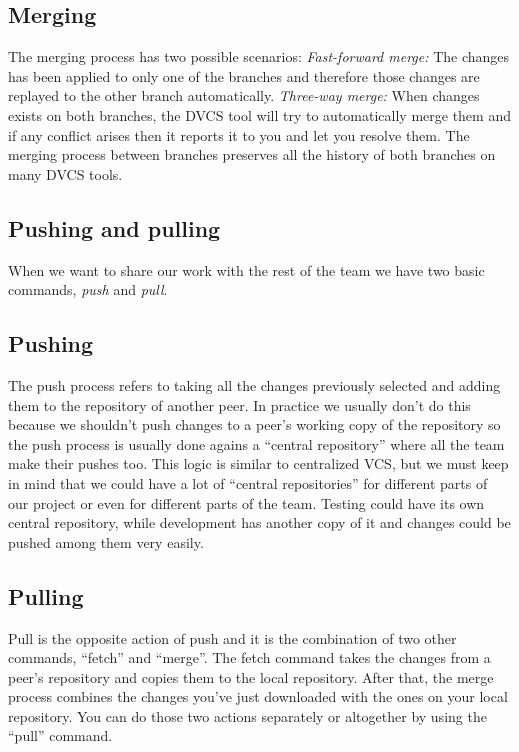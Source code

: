 \subsection{Merging}
The merging process has two possible scenarios:
\emph{Fast-forward merge:} The changes has been applied to only one of the branches and therefore those changes are replayed to the other branch automatically.
\emph{Three-way merge:} When changes exists on both branches, the DVCS tool will try to automatically merge them and if any conflict arises then it reports it to you and let you resolve them. 
The merging process\cite{svnmerging} between branches preserves all the history of 
both branches on many DVCS tools.

\subsection{Pushing and pulling}
When we want to share our work with the rest of the team we have two basic commands, 
\emph{push} and \emph{pull}.

\subsection{Pushing}
The push process refers to taking all the changes previously selected and adding them to the repository of another peer. In practice we usually don't do this because we shouldn't push changes to a peer's working copy of the repository so the push process is usually done agains a ``central repository'' where all the team make their pushes too. This logic is similar to centralized VCS, but we must keep in mind that we could have a lot of ``central repositories'' for different parts of our project or even for different parts of the team. Testing could have its own central repository, while development has another copy of it and changes could be pushed among them very easily.

\subsection{Pulling}
Pull is the opposite action of push and it is the combination of two other commands, ``fetch'' and ``merge''. The fetch command takes the changes from a peer's repository and copies them to the local repository. After that, the merge process combines the changes you've just downloaded with the ones on your local repository. You can do those two actions separately or altogether by using the ``pull'' command.

